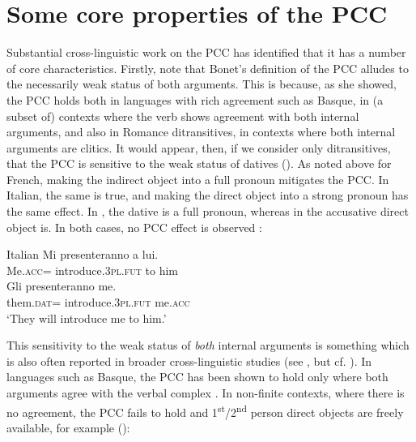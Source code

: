 \documentclass[output=paper,colorlinks,citecolor=brown,nonflat]{./langscibook}
\begin{document}
\section{Some core properties of the PCC}\label{sec:sheehan:2}

Substantial cross-linguistic work on the PCC has identified that it has a number of core characteristics. Firstly, note that Bonet’s definition of the PCC alludes to the necessarily weak status of both arguments. This is because, as she showed, the PCC holds both in languages with rich agreement such as Basque, in (a subset of) contexts where the verb shows agreement with both internal arguments, and also in Romance ditransitives, in contexts where both internal arguments are clitics. It would appear, then, if we consider only ditransitives, that the PCC is sensitive to the weak status of datives (\citealt{Bonet1991, Anagnostopoulou2005, Bianchi2006, Stegovec2017}). As noted above for French, making the indirect object into a full pronoun mitigates the PCC. In Italian, the same is true, and making the direct object into a strong pronoun has the same effect. In , the dative is a full pronoun, whereas in  the accusative direct object is. In both cases, no PCC effect is observed \citep{Bianchi2006}:

\ea%
    \label{ex:sheehan:9}
    Italian \citep[2041]{Bianchi2006}
    \ea\label{ex:sheehan:9a}
    \gll    Mi   presenteranno       a  lui.\\
            Me.\textsc{acc}=  introduce.\textsc{3pl}.\textsc{fut}   to   him\\
    \ex\label{ex:sheehan:9b}
    \gll    Gli     presenteranno       me.\\
            them.\textsc{dat=}  introduce.\textsc{3pl}.\textsc{fut} me.\textsc{acc}\\
    \glt    ‘They will introduce me to him.’
    \z
\z

This sensitivity to the weak status of \textit{both} internal arguments is something which is also often reported in broader cross-linguistic studies (see \citealt{Stegovec2017}, but cf. \citealt{OrmazabalRomero2007}). In languages such as Basque, the PCC has been shown to hold only where both arguments agree with the verbal complex \citep{Laka1996}. In non-finite contexts, where there is no agreement, the PCC fails to hold and 1\textsuperscript{st}/2\textsuperscript{nd} person direct objects are freely available, for example (\citealt{Laka1996, Preminger2019}): 
\end{document}
